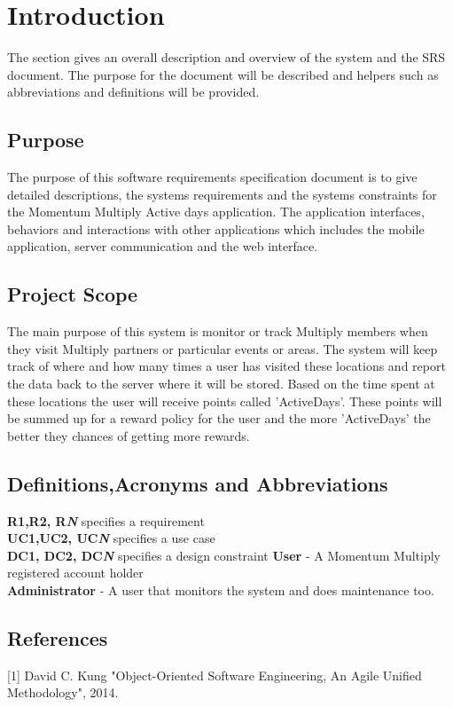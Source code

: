 \documentclass[11pt]{article}
\begin{document}
\newpage
\tableofcontents
\section{Introduction}
The section gives an overall description and overview of the system and the SRS document. The purpose for the document will be described and helpers such as abbreviations and definitions will be provided.
\subsection{Purpose}
The purpose of this software requirements specification document is to give detailed descriptions, the systems requirements and the systems constraints for the Momentum Multiply Active days application. The application interfaces, behaviors and interactions with other applications which includes the mobile application, server communication and the web interface.
\subsection{Project Scope}
The main purpose of this system is monitor or track Multiply members when they visit Multiply partners or particular events or areas. The system will keep track of where and how many times a user has visited these locations and report the data back to the server where it will be stored. Based on the time spent at these locations the user will receive points called 'ActiveDays'. These points will be summed up for a reward policy for the user and the more 'ActiveDays' the better they chances of getting more rewards. 
\subsection{Definitions,Acronyms and Abbreviations}
\textbf{R1,R2, R\textit{N}} specifies a requirement \\
\textbf{UC1,UC2, UC\textit{N}} specifies a use case \\
\textbf{DC1, DC2, DC\textit{N}} specifies a design constraint
\textbf{User} - A Momentum Multiply registered account holder\\
\textbf{Administrator} - A user that monitors the system and does maintenance too.
\subsection{References}
[1] David C. Kung "Object-Oriented Software Engineering, An Agile Unified Methodology", 2014.
\end{document}
